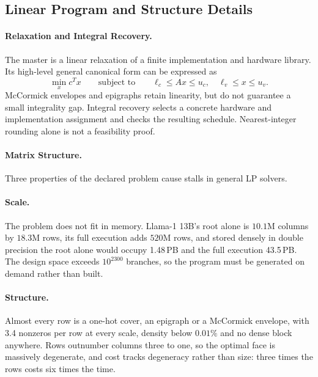








\subsection{Linear Program and Structure Details}
\label{app:lps}

\paragraph{Relaxation and Integral Recovery.}\label{app:lp_relaxation}
The master is a linear relaxation of a finite implementation and hardware library.
Its high-level general canonical form can be expressed as
\begin{equation}
\min_x c^Tx\qquad\text{subject to}\qquad
\ell_c\le Ax\le u_c,\quad\ell_v\le x\le u_v.
\label{eq:lp}
\end{equation}
McCormick envelopes and epigraphs retain linearity, but do not guarantee a small integrality gap.
Integral recovery selects a concrete hardware and implementation assignment and checks the resulting schedule.
Nearest-integer rounding alone is not a feasibility proof.

\paragraph{Matrix Structure.}\label{append::lp_perform}
\label{app:naive_fails}
Three properties of the declared problem cause stalls in general LP solvers.
\paragraph{Scale.} The problem does not fit in memory.
Llama-1 13B's root alone
is $10.1$M columns by $18.3$M rows, its full execution adds $520$M rows, and stored densely in double precision the root alone would occupy 1.48\,PB and the full execution 43.5\,PB.
The design space exceeds $10^{2300}$ branches, so the program must be generated on demand rather than built.
\paragraph{Structure.} Almost every row is a one-hot cover, an epigraph or a
McCormick envelope, with 3.4 nonzeros per row at every scale, density below $0.01\%$ and no dense block anywhere.
Rows outnumber columns three to one, so the optimal face is massively degenerate, and cost tracks degeneracy rather than size: three times the rows costs six times the time.
